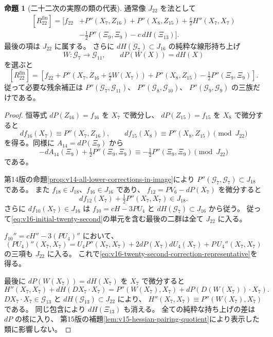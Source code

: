 \documentclass[a4paper,11pt]{ltjsarticle}
\theoremstyle{definition}
\newtheorem{theorem}{命題}[section]
\begin{document}
\begin{theorem}[二十二次の実際の類の代表]
\label{thm:v16-twenty-second-correction-representative}
通常像 $J_{22}$ を法として
\begin{equation}\label{eq:v16-twenty-second-correction-representative}
\begin{split}
 [R_{22}^{\mathrm{fin}}]=\bigl[ f_{22}
  &+P''(X_7,Z_{16})+P''(X_8,Z_{15})
    +\tfrac c2H''(X_7,X_7)\\
  &-\tfrac12P''(\Xi_9,\Xi_9)-c\,dH(\Xi_{13})\bigr].
\end{split}
\end{equation}
最後の項は $J_{22}$ に属する。
さらに $dH(\mathcal G_7)\subset J_{16}$ の純粋な線形持ち上げ
\[
 W:\mathcal G_7\longrightarrow\mathcal G_{11},\qquad
 dP(W(X))=dH(X)
\]
を選ぶと
\begin{equation}\label{eq:v16-three-quadratic-families}
\boxed{\displaystyle
 [R_{22}^{\mathrm{fin}}]=
 \left[f_{22}+P''\!\left(X_7,Z_{16}+\tfrac c2W(X_7)\right)
       +P''(X_8,Z_{15})-\tfrac12P''(\Xi_9,\Xi_9)\right].}
\end{equation}
従って必要な残余補正は
$P''(\mathcal G_7,\mathcal G_{11})$、
$P''(\mathcal G_8,\mathcal G_{10})$、
$P''(\mathcal G_9,\mathcal G_9)$ の三族だけである。
\end{theorem}

\begin{proof}
恒等式 $dP(Z_{16})=f_{16}$ を $X_7$ で微分し、
$dP(Z_{15})=f_{15}$ を $X_8$ で微分すると
\[
 df_{16}(X_7)\equiv P''(X_7,Z_{16}),\qquad
 df_{15}(X_8)\equiv P''(X_8,Z_{15})\pmod{J_{22}}
\]
を得る。同様に $A_{14}=dP(\Xi_9)$ から
\[
 -dA_{14}(\Xi_9)+\tfrac12P''(\Xi_9,\Xi_9)
       \equiv-\tfrac12P''(\Xi_9,\Xi_9)\pmod{J_{22}}
\]
である。

第14版の命題\ref{prop:v14-all-lower-corrections-in-image}により
$P''(\mathcal G_7,\mathcal G_7)\subset J_{18}$ である。
また $f_{18}\in J_{18}$、$f_{16}\in J_{16}$ であり、
$f_{12}=PV_6-dP(X_7)$ を微分すると
\[
 df_{12}(X_7)+\tfrac12P''(X_7,X_7)\in J_{18}.
\]
さらに $df_{10}(X_7)\in J_{16}$ は
$f_{10}=cH-3PU_4$ と $dH(\mathcal G_7)\subset J_{16}$ から従う。
従って\eqref{eq:v16-initial-twenty-second}の単元を含む最後の二群は全て $J_{22}$ に入る。

$f_{10}''=cH''-3(PU_4)''$ において、
\[
 (PU_4)''(X_7,X_7)
 =U_4P''(X_7,X_7)+2dP(X_7)dU_4(X_7)
                        +P\,U_4''(X_7,X_7)
\]
の三項も $J_{22}$ に入る。
これで\eqref{eq:v16-twenty-second-correction-representative}を得る。

最後に $dP(W(X_7))=dH(X_7)$ を $X_7$ で微分すると
\[
 H''(X_7,X_7)+dH(DX_7\cdot X_7)
 =P''(W(X_7),X_7)+dP(D(W(X_7))\cdot X_7).
\]
$DX_7\cdot X_7\in\mathcal G_{13}$ と
$dH(\mathcal G_{13})\subset J_{22}$ により、
$H''(X_7,X_7)\equiv P''(W(X_7),X_7)$ である。
同じ包含により $dH(\Xi_{13})$ も消える。
全ての純粋な持ち上げの差は $dP$ の核に入り、
第15版の補題\ref{lem:v15-hessian-pairing-quotient}により表示した類に影響しない。
\end{proof}
\end{document}
